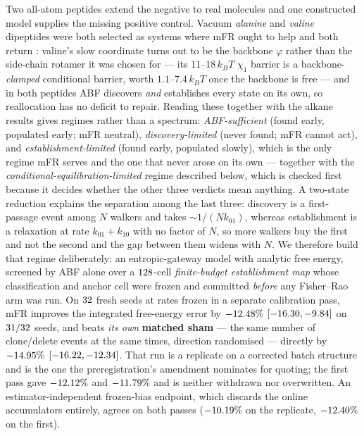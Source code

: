 Two all-atom peptides extend the negative to real molecules and one constructed model
supplies the missing positive control. Vacuum \emph{alanine} and \emph{valine} dipeptides
were both selected as systems where mFR ought to help and both return
\textbf{\AlaVerdict}: valine's slow coordinate turns out to be the backbone $\varphi$ rather
than the side-chain rotamer it was chosen for --- its $11$--$18\,k_BT$ $\chi_1$ barrier is a
backbone-\emph{clamped} conditional barrier, worth $1.1$--$7.4\,k_BT$ once the backbone is
free --- and in both peptides ABF discovers \emph{and} establishes every state on its own, so
reallocation has no deficit to repair. Reading these together with the alkane results gives
regimes rather than a spectrum: \emph{ABF-sufficient} (found early, populated early;
mFR neutral), \emph{discovery-limited} (never found; mFR cannot act), and
\emph{establishment-limited} (found early, populated slowly), which is the only regime mFR
serves and the one that never arose on its own --- together with the
\emph{conditional-equilibration-limited} regime described below, which is checked first
because it decides whether the other three verdicts mean anything. A two-state reduction
explains the separation among the last three: discovery
is a first-passage event among $N$ walkers and takes $\sim 1/(N k_{01})$, whereas
establishment is a relaxation at rate $k_{01}+k_{10}$ with no factor of $N$, so more walkers
buy the first and not the second and the gap between them widens with $N$. We therefore build
that regime deliberately: an entropic-gateway model with analytic free energy, screened by
ABF alone over a $128$-cell \emph{finite-budget establishment map} whose classification
and anchor cell were frozen and committed \emph{before} any Fisher--Rao arm was run. On
$32$ fresh seeds at rates frozen in a separate calibration pass, mFR improves the
integrated free-energy error by $-12.48\%$ $[-16.30, -9.84]$ on
$31/32$ seeds, and beats \emph{its own} \textbf{matched sham} --- the same number of
clone/delete events at the same times, direction randomised --- directly by $-14.95\%$
$[-16.22, -12.34]$. That run is a replicate on a corrected batch structure
and is the one the preregistration's amendment nominates for quoting; the first pass gave
$-12.12\%$ and $-11.79\%$ and is neither withdrawn nor overwritten. An
estimator-independent frozen-bias endpoint, which
discards the online accumulators entirely, agrees on both passes
($-10.19\%$ on the replicate, $-12.40\%$ on the first).

